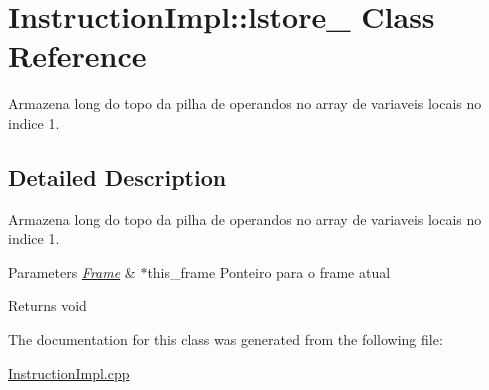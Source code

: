 \hypertarget{class_instruction_impl_1_1lstore__1}{}\section{Instruction\+Impl\+:\+:lstore\+\_ Class Reference}
\label{class_instruction_impl_1_1lstore__1}


Armazena long do topo da pilha de operandos no array de variaveis locais no indice 1.  




\subsection{Detailed Description}
Armazena long do topo da pilha de operandos no array de variaveis locais no indice 1. 


\begin{DoxyParams}{Parameters}
{\em \hyperlink{struct_frame}{Frame}} & $\ast$this\+\_\+frame Ponteiro para o frame atual \\
\hline
\end{DoxyParams}
\begin{DoxyReturn}{Returns}
void 
\end{DoxyReturn}


The documentation for this class was generated from the following file\+:\begin{DoxyCompactItemize}
\item 
\hyperlink{_instruction_impl_8cpp}{Instruction\+Impl.\+cpp}\end{DoxyCompactItemize}
